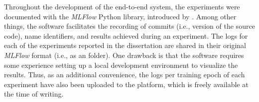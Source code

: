 
Throughout the development of the end-to-end system, the
experiments were documented with the \emph{MLFlow} Python
library, introduced by \textcite{zaharia2018accelerating}.
Among other things, the software facilitates the recording
of  commits (i.e., version of the source code),
name identifiers, and results achieved during an experiment.
The logs for each of the experiments reported in the
dissertation are shared in their original \emph{MLFlow}
format (i.e., as an  folder). One drawback is
that the software requires some experience setting up a
local development environment to visualize the results.
Thus, as an additional convenience, the logs per training
epoch of each experiment have also been uploaded to the
platform, which is
freely available at the time of writing.
